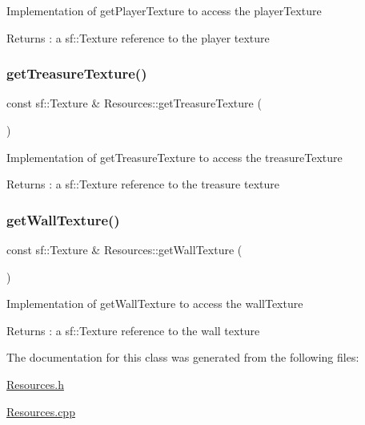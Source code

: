 Implementation of get\+Player\+Texture to access the player\+Texture \begin{DoxyReturn}{Returns}
\+: a sf\+::\+Texture reference to the player texture 
\end{DoxyReturn}
\hypertarget{class_resources_a575fd499564e6d905d7e08dfba1349e6}{}\label{class_resources_a575fd499564e6d905d7e08dfba1349e6} 
\subsubsection{\texorpdfstring{get\+Treasure\+Texture()}{getTreasureTexture()}}
{\footnotesize\ttfamily const sf\+::\+Texture \& Resources\+::get\+Treasure\+Texture (\begin{DoxyParamCaption}{ }\end{DoxyParamCaption})}

Implementation of get\+Treasure\+Texture to access the treasure\+Texture \begin{DoxyReturn}{Returns}
\+: a sf\+::\+Texture reference to the treasure texture 
\end{DoxyReturn}
\hypertarget{class_resources_af823e01e9f30b8a2070c23ba5c572113}{}\label{class_resources_af823e01e9f30b8a2070c23ba5c572113} 
\subsubsection{\texorpdfstring{get\+Wall\+Texture()}{getWallTexture()}}
{\footnotesize\ttfamily const sf\+::\+Texture \& Resources\+::get\+Wall\+Texture (\begin{DoxyParamCaption}{ }\end{DoxyParamCaption})}

Implementation of get\+Wall\+Texture to access the wall\+Texture \begin{DoxyReturn}{Returns}
\+: a sf\+::\+Texture reference to the wall texture 
\end{DoxyReturn}


The documentation for this class was generated from the following files\+:\begin{DoxyCompactItemize}
\item 
\hyperlink{_resources_8h}{Resources.\+h}\item 
\hyperlink{_resources_8cpp}{Resources.\+cpp}\end{DoxyCompactItemize}
